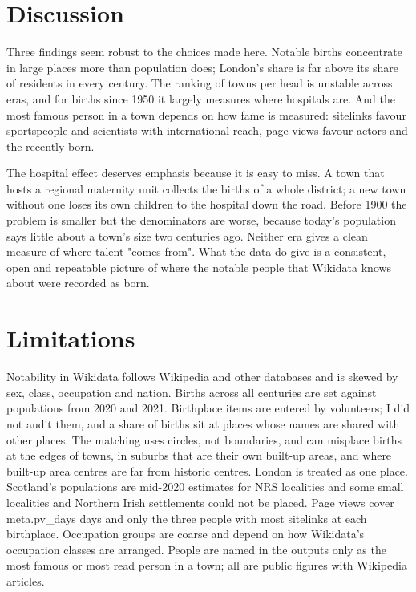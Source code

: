 \documentclass[11pt,a4paper]{article}
\begin{document}
\section{Discussion}

Three findings seem robust to the choices made here. Notable births concentrate in large places more than population does; London's share is far above its share of residents in every century. The ranking of towns per head is unstable across eras, and for births since 1950 it largely measures where hospitals are. And the most famous person in a town depends on how fame is measured: sitelinks favour sportspeople and scientists with international reach, page views favour actors and the recently born.

The hospital effect deserves emphasis because it is easy to miss. A town that hosts a regional maternity unit collects the births of a whole district; a new town without one loses its own children to the hospital down the road. Before 1900 the problem is smaller but the denominators are worse, because today's population says little about a town's size two centuries ago. Neither era gives a clean measure of where talent "comes from". What the data do give is a consistent, open and repeatable picture of where the notable people that Wikidata knows about were recorded as born.

\section{Limitations}

Notability in Wikidata follows Wikipedia and other databases and is skewed by sex, class, occupation and nation. Births across all centuries are set against populations from 2020 and 2021. Birthplace items are entered by volunteers; I did not audit them, and a share of births sit at places whose names are shared with other places. The matching uses circles, not boundaries, and can misplace births at the edges of towns, in suburbs that are their own built-up areas, and where built-up area centres are far from historic centres. London is treated as one place. Scotland's populations are mid-2020 estimates for NRS localities and some small localities and Northern Irish settlements could not be placed. Page views cover {{meta.pv_days}} days and only the three people with most sitelinks at each birthplace. Occupation groups are coarse and depend on how Wikidata's occupation classes are arranged. People are named in the outputs only as the most famous or most read person in a town; all are public figures with Wikipedia articles.
\end{document}
